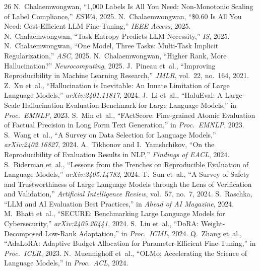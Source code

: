 \documentclass[review,3p]{elsarticle}
\begin{document}
\begin{thebibliography}{26}
 N.~Chalaemwongwan, ``1,000 Labels Is All You Need: Non-Monotonic Scaling of Label Compliance,'' \emph{ESWA}, 2025.
 N.~Chalaemwongwan, ``\$0.60 Is All You Need: Cost-Efficient LLM Fine-Tuning,'' \emph{IEEE Access}, 2025.
 N.~Chalaemwongwan, ``Task Entropy Predicts LLM Necessity,'' \emph{IS}, 2025.
 N.~Chalaemwongwan, ``One Model, Three Tasks: Multi-Task Implicit Regularization,'' \emph{ASC}, 2025.
 N.~Chalaemwongwan, ``Higher Rank, More Hallucination?'' \emph{Neurocomputing}, 2025.
 J.~Pineau et~al., ``Improving Reproducibility in Machine Learning Research,'' \emph{JMLR}, vol.~22, no.~164, 2021.
 Z.~Xu et~al., ``Hallucination is Inevitable: An Innate Limitation of Large Language Models,'' \emph{arXiv:2401.11817}, 2024.
 J.~Li et~al., ``HaluEval: A Large-Scale Hallucination Evaluation Benchmark for Large Language Models,'' in \emph{Proc.\ EMNLP}, 2023.
 S.~Min et~al., ``FActScore: Fine-grained Atomic Evaluation of Factual Precision in Long Form Text Generation,'' in \emph{Proc.\ EMNLP}, 2023.
 S.~Wang et~al., ``A Survey on Data Selection for Language Models,'' \emph{arXiv:2402.16827}, 2024.
 A.~Tikhonov and I.~Yamshchikov, ``On the Reproducibility of Evaluation Results in NLP,'' \emph{Findings of EACL}, 2024.
 S.~Biderman et~al., ``Lessons from the Trenches on Reproducible Evaluation of Language Models,'' \emph{arXiv:2405.14782}, 2024.
 T.~Sun et~al., ``A Survey of Safety and Trustworthiness of Large Language Models through the Lens of Verification and Validation,'' \emph{Artificial Intelligence Review}, vol.~57, no.~7, 2024.
 S.~Raschka, ``LLM and AI Evaluation Best Practices,'' in \emph{Ahead of AI Magazine}, 2024.
 M.~Bhatt et~al., ``SECURE: Benchmarking Large Language Models for Cybersecurity,'' \emph{arXiv:2405.20441}, 2024.
 S.~Liu et~al., ``DoRA: Weight-Decomposed Low-Rank Adaptation,'' in \emph{Proc.\ ICML}, 2024.
 Q.~Zhang et~al., ``AdaLoRA: Adaptive Budget Allocation for Parameter-Efficient Fine-Tuning,'' in \emph{Proc.\ ICLR}, 2023.
 N.~Muennighoff et~al., ``OLMo: Accelerating the Science of Language Models,'' in \emph{Proc.\ ACL}, 2024.
\end{thebibliography}
\end{document}
